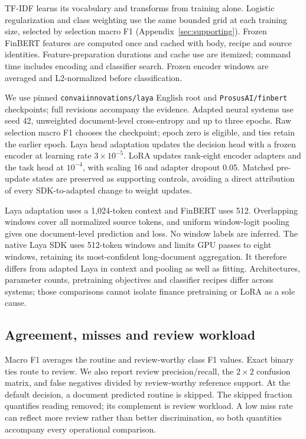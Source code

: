 \documentclass[11pt,a4paper]{article}
\begin{document}
TF-IDF learns its vocabulary and transforms from training alone. Logistic
regularization and class weighting use the same bounded grid at each training
size, selected by selection macro F1 (Appendix~\ref{sec:supporting}).
Frozen FinBERT features are computed once and cached with
body, recipe and source identities. Feature-preparation durations and cache use
are itemized; command time includes encoding and classifier search. Frozen encoder windows are averaged and
L2-normalized before classification.

We use pinned \texttt{convaiinnovations/laya} English root and
\texttt{ProsusAI/finbert} checkpoints; full revisions accompany the evidence.
Adapted neural systems use seed 42, unweighted document-level cross-entropy and
up to three epochs. Raw selection macro F1 chooses the checkpoint; epoch zero
is eligible, and ties retain the earlier epoch. Laya head adaptation updates
the decision head with a frozen encoder at learning rate $3\times10^{-5}$.
LoRA updates rank-eight encoder adapters and the task head at $10^{-4}$, with
scaling 16 and adapter dropout 0.05. Matched pre-update states are preserved
as supporting controls, avoiding a direct attribution of every SDK-to-adapted
change to weight updates.

Laya adaptation uses a 1,024-token context and FinBERT uses 512. Overlapping
windows cover all normalized source tokens, and uniform window-logit pooling
gives one document-level prediction and loss. No window labels are inferred.
The native Laya SDK uses 512-token windows and limits GPU passes to eight windows,
retaining its most-confident long-document aggregation. It therefore differs from
adapted Laya in context and pooling as well as fitting. Architectures, parameter counts,
pretraining objectives and classifier recipes differ across systems; those
comparisons cannot isolate finance pretraining or LoRA as a sole cause.

\subsection{Agreement, misses and review workload}
Macro F1 averages the routine and review-worthy class F1 values. Exact binary
ties route to review. We also report review precision/recall, the $2\times2$
confusion matrix, and false negatives divided by review-worthy reference
support. At the default decision, a document predicted routine is skipped.
The skipped fraction quantifies reading removed; its complement is review
workload. A low miss rate can reflect more review rather than better
discrimination, so both quantities accompany every operational comparison.
\end{document}
